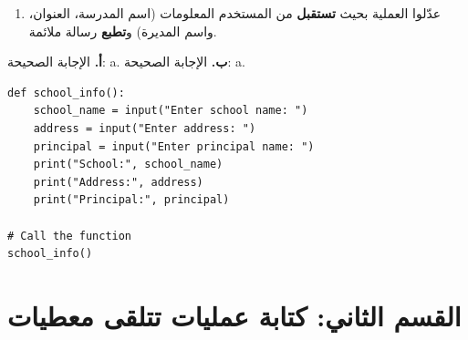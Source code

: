 \documentclass[14pt]{extarticle}
\begin{document}
\begin{enumerate}[label=\textbf{تمرين \arabic*:}, wide=0pt, itemsep=2.2em]
\begin{enumerate}[leftmargin=*, itemsep=1.2em]
\item[\textbf{ج.}] عدّلوا العملية بحيث \textbf{تستقبل} من المستخدم المعلومات (اسم المدرسة، العنوان، واسم المديرة) و\textbf{تطبع} رسالة ملائمة.
\end{enumerate}

\ifwithsols
\begin{boxSolution}[البندان أ و ب]
\textbf{أ.} الإجابة الصحيحة: \textenglish{a}. \quad \textbf{ب.} الإجابة الصحيحة: \textenglish{a}.
\end{boxSolution}

\begin{boxSolution}[البند ج]
\begin{english}
\begin{verbatim}
def school_info():
    school_name = input("Enter school name: ")
    address = input("Enter address: ")
    principal = input("Enter principal name: ")
    print("School:", school_name)
    print("Address:", address)
    print("Principal:", principal)

# Call the function
school_info()
\end{verbatim}
\end{english}
\end{boxSolution}

\fi

\end{enumerate}

\clearpage
\section*{القسم الثاني: كتابة عمليات تتلقى معطيات}
\end{document}
